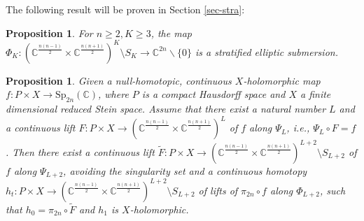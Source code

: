 \documentclass[10pt]{amsart}
\newtheorem{prop}[theo]{Proposition}
\theoremstyle{remark}
\begin{document}
The following result will be proven in Section \ref{sec-stra}:
\begin{prop} \label{reg-locus}
For $n \ge 2, K \ge 3$, the map $\Phi_K: (\mathbb{C}^{\frac{n(n-1)}{2}} \times \mathbb{C}^{\frac{n(n+1)}{2}})^K \setminus S_K \to \mathbb{C}^{2n}\backslash \lbrace 0 \rbrace$ is a stratified elliptic submersion.    
\end{prop}


\begin{prop}\label{sup-main} 
Given a null-homotopic, continuous $X$-holomorphic map $f : P \times X \to \mathrm{Sp}_{2n}(\mathbb{C})$, where $P$ is a compact Hausdorff space and $X$ a finite dimensional reduced Stein space. Assume that there exist a natural number $L$ and a continuous lift $F : P \times X \to (\mathbb{C}^{\frac{n(n-1)}{2}} \times \mathbb{C}^{\frac{n(n+1)}{2}})^L$ of $f$ along $\Psi_L$, i.e., $\Psi_L \circ F = f$.
Then there exist a continuous lift $\tilde F : P \times X \to (\mathbb{C}^{\frac{n(n-1)}{2}} \times \mathbb{C}^{\frac{n(n+1)}{2}})^{L+2} \setminus S_{L+2}$ of $f$ along $\Psi_{L+2}$, avoiding the singularity set and a continuous homotopy $h_t: P \times X \to (\mathbb{C}^{\frac{n(n-1)}{2}} \times \mathbb{C}^{\frac{n(n+1)}{2}})^{L+2}\setminus S_{L+2}$ of lifts of $\pi_{2n} \circ f$ along $\Phi_{L+2}$, such that $h_0 = \pi_{2n} \circ \tilde F $ and $h_1$ is $X$-holomorphic.
\end{prop}
\end{document}
